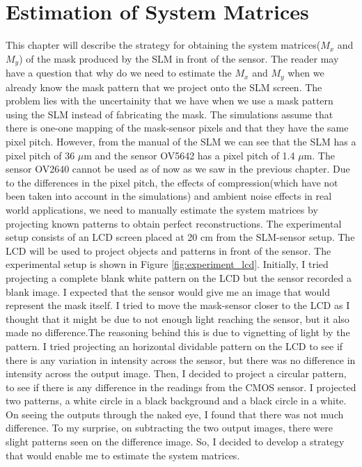 \chapter{Estimation of System Matrices}
This chapter will describe the strategy for obtaining the system matrices($M_x$ and $M_y$) of the mask produced by the SLM in front of the sensor. The reader may have a question that why do we need to estimate the $M_x$ and $M_y$ when we already know the mask pattern that we project onto the SLM screen. The problem lies with the uncertainity that we have when we use a mask pattern using the SLM instead of fabricating the mask. The simulations assume that there is one-one mapping of the mask-sensor pixels and that they have the same pixel pitch. However, from the manual of the SLM\cite{LC2012MAN}  we can see that the SLM has a pixel pitch of 36 $\mu$m and the sensor OV5642 has a pixel pitch of 1.4 $\mu$m. The sensor OV2640 cannot be used as of now as we saw in the previous chapter. Due to the differences in the pixel pitch, the effects of compression(which have not been taken into account in the simulations) and ambient noise effects in real world applications, we need to manually estimate the system matrices by projecting known patterns to obtain perfect reconstructions. 
The experimental setup consists of an LCD screen placed at 20 cm from the SLM-sensor setup. The LCD will be used to project objects and patterns in front of the sensor. The experimental setup is shown in Figure \ref{fig:experiment_lcd}.
Initially, I tried projecting a complete blank white pattern on the LCD but the sensor recorded a blank image. I expected that the sensor would give me an image that would represent the mask itself. I tried to move the mask-sensor closer to the LCD as I thought that it might be due to not enough light reaching the sensor, but it also made no difference.The reasoning behind this is due to vignetting of light by the pattern. I tried projecting an horizontal dividable pattern on the LCD to see if there is any variation in intensity across the sensor, but there was no difference in intensity across the output image. Then, I decided to project a circular pattern, to see if there is any difference in the readings from the CMOS sensor. I projected two patterns, a white circle in a black background and a black circle in a white. On seeing the outputs through the naked eye, I found that there was not much difference. To my surprise, on subtracting the two output images, there were slight patterns seen on the difference image. So, I decided to develop a strategy that would enable me to estimate the system matrices.

